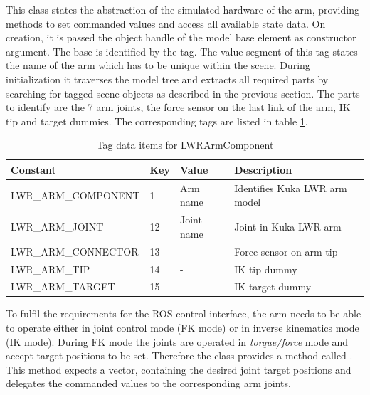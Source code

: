 This class states the abstraction of the simulated hardware of the arm, providing methods to set commanded values and access all available state data. On creation, it is passed the object handle of the model base element as constructor argument. The base is identified by the  tag. The value segment of this tag states the name of the arm which has to be unique within the scene. During initialization it traverses the model tree and extracts all required parts by searching for tagged scene objects as described in the previous section. The parts to identify are the 7 arm joints, the force sensor on the last link of the arm, IK tip and target dummies. The corresponding tags are listed in table \ref{fig:lwr_tags}. \\

\begin{table}[ht]
  \centering
  \begin{tabularx}{\textwidth}{|l|l|l|X|} \hline
	\textbf{Constant} & \textbf{Key} & \textbf{Value} & \textbf{Description} \\ \hline
	LWR\_ARM\_COMPONENT & 1 & Arm name & Identifies Kuka LWR arm model \\
	LWR\_ARM\_JOINT & 12 & Joint name & Joint in Kuka LWR arm \\
	LWR\_ARM\_CONNECTOR & 13 & - & Force sensor on arm tip \\
	LWR\_ARM\_TIP & 14 & - & IK tip dummy \\
	LWR\_ARM\_TARGET & 15 & - & IK target dummy  \\ \hline
  \end{tabularx}
  \caption{Tag data items for LWRArmComponent}
  \label{fig:lwr_tags}
\end{table}

To fulfil the requirements for the ROS control interface, the arm needs to be able to operate either in joint control mode (FK mode) or in inverse kinematics mode (IK mode). During FK mode the joints are operated in \emph{torque/force} mode and accept target positions to be set. Therefore the  class provides a method called . This method expects a vector, containing the desired joint target positions and delegates the commanded values to the corresponding arm joints. \\

